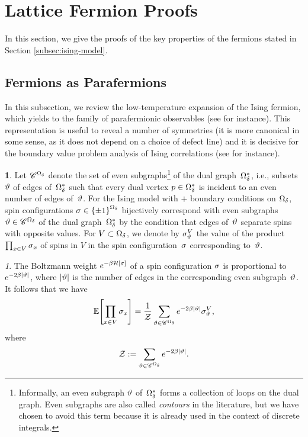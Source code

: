 \documentclass[12pt,oneside,english]{amsart}
\numberwithin{equation}{section}
\numberwithin{figure}{section}
\theoremstyle{plain}
\theoremstyle{plain}
\theoremstyle{plain}
\theoremstyle{plain}
\theoremstyle{remark}
\newtheorem{rem}[thm]{\protect\remarkname}
\theoremstyle{definition}
\newtheorem{defn}[thm]{\protect\definitionname}
\theoremstyle{plain}
\theoremstyle{plain}
\numberwithin{thm}{section}
\newcommand{\kallemod}[1]{{\color{kallecol} {#1}}}
\providecommand{\definitionname}{Definition}
\providecommand{\remarkname}{Remark}
\providecommand{\definitionname}{Definition}
\providecommand{\remarkname}{Remark}
\providecommand{\definitionname}{Definition}
\providecommand{\remarkname}{Remark}
\providecommand{\definitionname}{Definition}
\providecommand{\remarkname}{Remark}
\begin{document}
\section{\label{sec:lattice-fermion-proofs}Lattice Fermion Proofs}


In this section, we give the proofs of the key properties of the fermions
stated in Section \ref{subsec:ising-model}. 

\subsection{Fermions as Parafermions}

In this subsection, we review the low-temperature expansion of the
Ising fermion, which yields to the family of parafermionic observables
(see \cite{smirnov-iv} for instance). This representation is useful
to reveal a number of symmetries (it is more canonical in some sense,
as it does not depend on a choice of defect line) and it is decisive
for the boundary value problem analysis of Ising correlations (see
\cite{chelkak-hongler-izyurov,hongler-smirnov,hongler} for instance). 
\begin{defn}
Let ${{\mathscr{C}}}^{{{{\Omega}}_{{\delta}} }}$ denote the set of
even subgraphs\footnote{
Informally, an even subgraph ${\vartheta}$ of~${{\Omega}}_{{\delta}}^*$ forms a collection of 
loops on the 
dual graph. Even subgraphs are also called \emph{contours} in the 
literature, but we have chosen to avoid this term because it is 
already used in the context of discrete integrals.}
of the dual graph~${{\Omega}}_{{\delta}}^*$,
i.e., subsets ${\vartheta}$ of edges of~${{\Omega}}_{{\delta}}^*$ such that every 
dual vertex $p \in {{\Omega}}_{{\delta}}^*$ is incident to an even number of edges 
of~${\vartheta}$.
For the Ising model with $+$ boundary conditions on ${{\Omega}}_{{\delta}} $,
spin configurations ${\sigma} \in \left\{ \pm 1 \right\}^{{{\Omega}}_{{\delta}}}$ bijectively
correspond with even subgraphs ${\vartheta}\in{{\mathscr{C}}}^{{{{\Omega}}_{{\delta}} }}$ of the 
dual graph~${{\Omega}}_{{\delta}}^*$ by the condition that edges of~${\vartheta}$ separate 
spins with opposite values. For $V \subset {{\Omega}}_{{\delta}}$,
we denote by ${\sigma}_{{\vartheta}}^{V}$ the value of the product
$\prod_{x\in V}{\sigma}_{x}$ of spins in $V$ in the spin configuration~${\sigma}$ 
corresponding to~${\vartheta}$.
\end{defn}

\begin{rem}\label{rem: Boltzmann weights in LTE}
The Boltzmann weight $e^{-{{\beta}} \mathcal{H}[{\sigma}]}$
of a spin configuration ${\sigma}$ is 
proportional to~$e^{-2{{\beta}}\left|{\vartheta}\right|}$, where $|{\vartheta}|$ is 
the number of edges in the corresponding even subgraph~${\vartheta}$.
It follows that we have
\[ \mathbb{E} \! \left[ { \prod_{x\in V}{\sigma}_{x} } \right] =
\frac{1}{\mathcal{Z}}\sum_{{\vartheta}\in{{\mathscr{C}}}^{{{{\Omega}}_{{\delta}} }}}
e^{ -2{{\beta}}\left|{\vartheta}\right|}{\sigma}_{{\vartheta}}^{V} , \]
where \[\mathcal{Z} :=
\sum_{{\vartheta}\in{{\mathscr{C}}}^{{{{\Omega}}_{{\delta}} }}}e^{-2{{\beta}}\left|{\vartheta}\right|} . \]
\end{rem}
\end{document}

